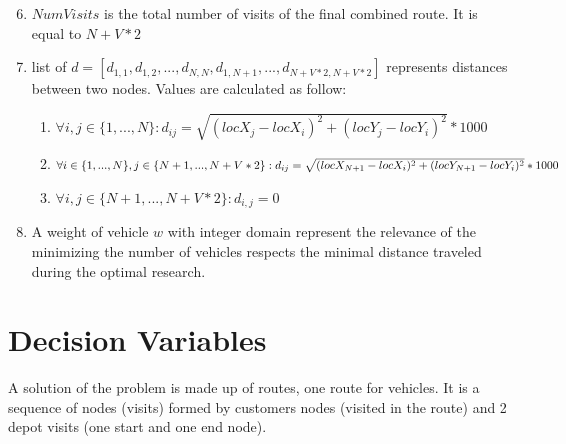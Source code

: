\begin{enumerate}
 \setcounter{enumi}{5}
    \item \begin{math}NumVisits\end{math} is the total number of visits of the final combined route. It is equal to \begin{math}N + V * 2\end{math}
    \item list of \begin{math}d= [d_{1,1},d_{1,2},..., d_{N,N}, d_{1,N+1},...,d_{N+V*2,N+V*2}] \end{math} represents distances between two nodes. Values are calculated as follow:\newline
    \begin{enumerate}
        \item\begin{math}\forall i,j \in \{1,...,N\}: d_{ij} = \sqrt{(locX_{j} - locX_{i})^2 + (locY_{j} - locY_{i})^2} * 1000\end{math}
        \item\begin{math}\forall i \in \{1,...,N\}, j \in \{N + 1,...,  N + V * 2\}:\newline d_{ij} = \sqrt{(locX_{N+1} - locX_{i})^2 + (locY_{N+1} - locY_{i})^2} * 1000\end{math}
        \item \begin{math}\forall i,j \in \{N + 1,...,  N + V * 2\}: d_{i,j} = 0\end{math}
    \end{enumerate}
    \item A weight of vehicle \begin{math}w\end{math} with integer domain represent the relevance of the minimizing the number of vehicles respects the minimal distance traveled during the optimal research. 
\end{enumerate}
\section{Decision Variables}
A solution of the problem is made up of routes, one route for vehicles. It is a sequence of nodes (visits) formed by customers nodes (visited in the route) and 2 depot visits (one start and one end node).

